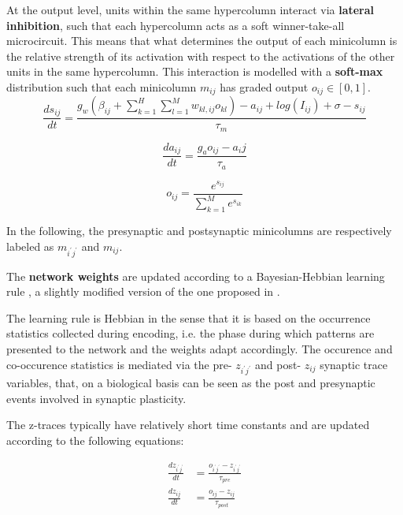 At the output level, units within the same hypercolumn interact via \textbf{lateral inhibition}, such that each hypercolumn acts as a soft winner-take-all microcircuit. This means that what determines the output of each minicolumn is the relative strength of its activation with respect to the activations of the other units in the same hypercolumn. This interaction is modelled with a \textbf{soft-max} distribution such that each minicolumn $m_{ij}$ has graded output $o_{ij}\in[0,1]$. 
\begin{equation}
    \frac{ds_{ij}}{dt} = \frac{g_w(\beta_{ij}+\sum\limits_{k=1}^H\sum\limits_{l=1}^M w_{kl,ij}o_{kl})-a_{ij}+log(I_{ij})+\sigma-s_{ij}}{\tau_m} 
    \label{eq:sij}
\end{equation}

\begin{equation}
    \frac{da_{ij}}{dt} = \frac{g_ao_{ij}-a_ij}{\tau_a} 
    \label{eq:aij}
\end{equation}

\begin{equation}
    o_{ij} = \frac{e^{s_{ij}}}{ \sum\limits_{k=1}^M e^{s_{ik}}}
    \label{eq:oij}
\end{equation}

In the following, the presynaptic and postsynaptic minicolumns are respectively labeled as $m_{i^{\prime}j^{\prime}}$ and $m_{ij}$.  

The \textbf{network weights} are updated according to a Bayesian-Hebbian learning rule \cite{LansnerFRC}, a slightly modified version of the one proposed in \cite{SANDBERG2000987}.

The learning rule is Hebbian in the sense that it is based on the occurrence statistics collected during encoding, i.e. the phase during which patterns are presented to the network and the weights adapt accordingly.
The occurence and co-occurence statistics is mediated via the  pre- $z_{i^{\prime}j^{\prime}}$ and post- $z_{ij}$ synaptic trace variables, that, on a biological basis can be seen as the post and presynaptic events involved in synaptic plasticity. 

The z-traces typically have relatively short time constants and are updated according to the following equations:

\begin{equation}
\begin{aligned}
     \frac{dz_{i^{\prime}j^{\prime}}}{dt} & = \frac{o_{i^{\prime}j^{\prime}}-z_{i^{\prime}j^{\prime}}}{\tau_{pre}} \\
      \frac{dz_{ij}}{dt} & = \frac{o_{ij}-z_{ij}}{\tau_{post}} 
     \end{aligned}
    \label{eq:zij}
\end{equation}

